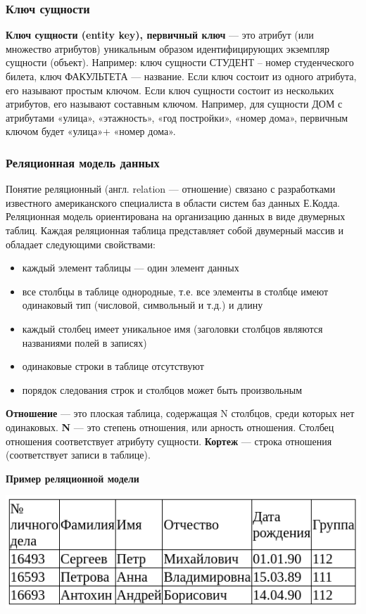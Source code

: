 \documentclass[a4paper]{article}
\begin{document}
\subsubsection{Ключ сущности}

\textbf{Ключ сущности (entity key), первичный ключ} --- это атрибут (или множество атрибутов) уникальным образом идентифицирующих экземпляр сущности (объект). Например: ключ сущности СТУДЕНТ – номер студенческого билета, ключ ФАКУЛЬТЕТА --- название. Если ключ состоит из одного атрибута, его называют простым ключом. Если ключ сущности состоит из нескольких атрибутов, его называют составным ключом. Например, для сущности ДОМ с атрибутами «улица», «этажность», «год постройки», «номер дома», первичным ключом будет «улица»+ «номер дома».

\subsubsection{Реляционная модель данных}

Понятие реляционный (англ. relation --- отношение) связано с разработками известного американского специалиста в области систем баз данных Е.Кодда. Реляционная модель ориентирована на организацию данных в виде двумерных таблиц. Каждая реляционная таблица представляет собой двумерный массив и обладает следующими свойствами:

\begin{itemize}
    \item каждый элемент таблицы --- один элемент данных
    \item все столбцы в таблице однородные, т.е. все элементы в столбце имеют одинаковый тип (числовой, символьный и т.д.) и длину
    \item каждый столбец имеет уникальное имя (заголовки столбцов являются названиями полей в записях)
    \item одинаковые строки в таблице отсутствуют
  \item порядок следования строк и столбцов может быть произвольным
\end{itemize}

\textbf{Отношение} --- это плоская таблица, содержащая N столбцов, среди которых нет одинаковых. \textbf{N} --- это степень отношения, или арность отношения. Столбец отношения соответствует атрибуту сущности. \textbf{Кортеж} --- строка отношения (соответствует записи в таблице).

\textbf{Пример реляционной модели}

\includegraphics[width=\textwidth]{db1.png}
\end{document}
